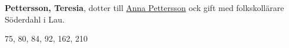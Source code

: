 \textbf{Pettersson, Teresia}, dotter till \href{Pettersson-A}{Anna Pettersson} ock gift med folkskollärare Söderdahl i Lau.

75, 80, 84, 92, 162, 210 
